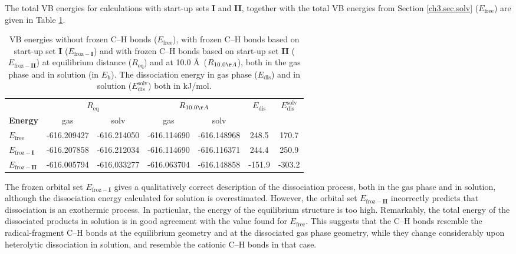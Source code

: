 The total VB energies for calculations with start-up sets \textbf{I} and \textbf{II}, together with the total VB energies from Section \ref{ch3.sec.solv} ($E_\mathrm{free}$) are given in Table \ref{ch3.tab.frozen}. 
\begin{table}[hbp]
\center
\caption{VB energies without frozen C--H bonds ($E_\mathrm{free}$), with frozen C--H bonds based on
start-up set \textbf{I} ($E_\mathrm{froz-\textbf{I}}$) and with frozen C--H bonds based on start-up set \textbf{II}
($E_\mathrm{froz-\textbf{II}}$) at equilibrium distance ($R_\mathrm{eq}$) and at 10.0 \AA\ ($R_{10.0 \AA}$),
both in the gas phase and in solution (in $E_\mathrm{h}$). The dissociation energy in gas phase ($E_\mathrm{dis}$) and in solution ($E_\mathrm{dis}^\mathrm{solv}$) both in kJ/mol.}
\center
\begin{tabular}{ l c c c c c c }
\hline
&\multicolumn{2}{c}{$R_\mathrm{eq}$}&\multicolumn{2}{c}{$R_{10.0 \AA}$} & $E_\mathrm{dis}$ & $E_\mathrm{dis}^\mathrm{solv}$ \\
\textbf{Energy} & gas & solv & gas & solv &&\\
\hline
$E_\mathrm{free}$      & -616.209427 & -616.214050 & -616.114690 & -616.148968 & 248.5 & 170.7 \\
$E_\mathrm{froz-\textbf{I}}$& -616.207858 & -616.212034 & -616.114690 & -616.116371 & 244.4 & 250.9 \\
$E_\mathrm{froz-\textbf{II}}$& -616.005794 & -616.033277 & -616.063704 & -616.148858 & -151.9 & -303.2 \\
\end{tabular}
\label{ch3.tab.frozen}
\end{table}

The frozen orbital set $E_{\mathrm{froz}-\textbf{I}}$ gives a qualitatively correct description of the dissociation process, both in the gas phase and in solution, although the dissociation energy calculated for solution is overestimated.  However, the orbital set $E_{\mathrm{froz}-\textbf{II}}$ incorrectly predicts that dissociation is an exothermic process.  In particular, the energy of the equilibrium structure is too high.  Remarkably, the total energy of the dissociated products in solution is in good agreement with the value found for $E_{\mathrm{free}}$.  This suggests that the C--H bonds resemble the radical-fragment C--H bonds at the equilibrium geometry and at the dissociated gas phase geometry, while they change considerably upon heterolytic dissociation in solution, and resemble the cationic C--H bonds in that case.

